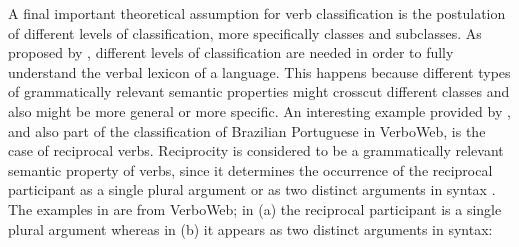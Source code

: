 \documentclass[english]{textolivre}
\begin{document}
A final important theoretical assumption for verb classification is the postulation of different levels of classification, more specifically classes and subclasses. As proposed by \textcite{levin_english_1993}, different levels of classification are needed in order to fully understand the verbal lexicon of a language. This happens because different types of grammatically relevant semantic properties might crosscut different classes and also might be more general or more specific. An interesting example provided by \textcite{wetzels_lexical_2016}, and also part of the classification of Brazilian Portuguese in VerboWeb, is the case of reciprocal verbs. Reciprocity is considered to be a grammatically relevant semantic property of verbs, since it determines the occurrence of the reciprocal participant as a single plural argument or as two distinct arguments in syntax \cite{godoy_os_2008}. The examples in  are from VerboWeb; in (a) the reciprocal participant is a single plural argument whereas in (b) it appears as two distinct arguments in syntax:
\end{document}

